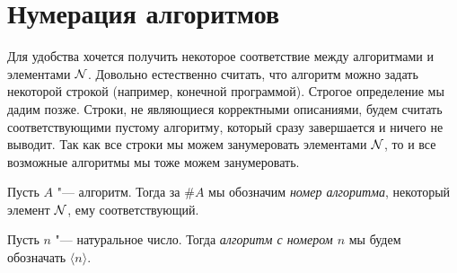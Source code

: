 \section{Нумерация алгоритмов}
Для удобства хочется получить некоторое соответствие между алгоритмами и элементами $\mathcal{N}$.
Довольно естественно считать, что алгоритм можно задать некоторой строкой (например, конечной программой).
Строгое определение мы дадим позже.
Строки, не являющиеся корректными описаниями, будем считать соответствующими пустому алгоритму, который сразу завершается и ничего не выводит.
Так как все строки мы можем занумеровать элементами $\mathcal{N}$, то и все возможные алгоритмы мы тоже можем занумеровать.

\begin{Def}
	Пусть $A$ "--- алгоритм.
	Тогда за $\#A$ мы обозначим \textit{номер алгоритма}, некоторый элемент $\mathcal{N}$, ему соответствующий.
\end{Def}

\begin{Def}
	Пусть $n$ "--- натуральное число.
	Тогда \textit{алгоритм с номером $n$} мы будем обозначать $\langle n \rangle$.
\end{Def}
